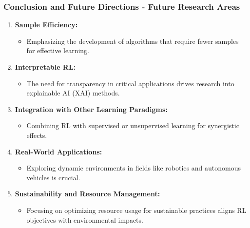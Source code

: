 \documentclass{beamer}
\begin{document}
\begin{frame}[fragile]
    \frametitle{Conclusion and Future Directions - Future Research Areas}
    \begin{enumerate}
        \item \textbf{Sample Efficiency:}
        \begin{itemize}
            \item Emphasizing the development of algorithms that require fewer samples for effective learning.
        \end{itemize}

        \item \textbf{Interpretable RL:}
        \begin{itemize}
            \item The need for transparency in critical applications drives research into explainable AI (XAI) methods.
        \end{itemize}

        \item \textbf{Integration with Other Learning Paradigms:}
        \begin{itemize}
            \item Combining RL with supervised or unsupervised learning for synergistic effects.
        \end{itemize}
        
        \item \textbf{Real-World Applications:}
        \begin{itemize}
            \item Exploring dynamic environments in fields like robotics and autonomous vehicles is crucial.
        \end{itemize}

        \item \textbf{Sustainability and Resource Management:}
        \begin{itemize}
            \item Focusing on optimizing resource usage for sustainable practices aligns RL objectives with environmental impacts.
        \end{itemize}
    \end{enumerate}    
\end{frame}
\end{document}
